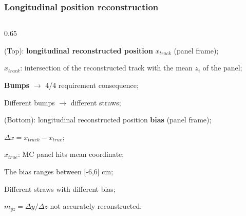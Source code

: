 \documentclass{beamer}
\begin{document}
\begin{frame}
    \frametitle{Longitudinal position reconstruction}

    \begin{columns}
\begin{column}{0.65\framewidth}
\vspace{-6mm}
   \setlength{\leftmargini}{1.2em}
      \begin{itemize}
 {\footnotesize
 \item (Top): \textbf{longitudinal reconstructed position} $x_{track}$ (panel frame);
  \vspace{1.6mm}
 \item $x_{track}$: intersection of the reconstructed track with the mean $z_i$ of the panel;
   \vspace{1.6mm}
 \item  \textbf{Bumps} $\rightarrow$ 4/4 requirement consequence;
   \vspace{1.6mm}
\item Different bumps $\rightarrow$ different straws;
  \vspace{1.6mm}
\item (Bottom): longitudinal reconstructed position \textbf{bias} (panel frame);
  \vspace{1.6mm}
 \item $\Delta x = x_{track}-x_{true}$;
   \vspace{1.6mm}
 \item $x_{true}$: MC panel hits mean coordinate;
   \vspace{1.6mm}
\item The bias ranges between [-6,6] cm;
  \vspace{1.6mm}
\item Different straws with different bias; 
  \vspace{1.6mm}
\item $m_{yz}=\Delta y/\Delta z$ not accurately reconstructed.}


\end{itemize}
\end{column}
\end{columns}
\end{frame}
\end{document}
